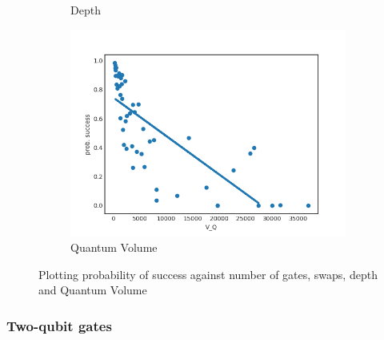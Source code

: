 \documentclass[11pt]{article}
\begin{document}
\begin{figure}[H]
\begin{subfigure}[b]{0.5\linewidth}
    \caption{Depth} 
    \label{fig:ps_d_1000} 
  \end{subfigure}%
  \begin{subfigure}[b]{0.5\linewidth}
    \centering
    \includegraphics[width=0.75\linewidth]{ps_q_1000_0_005} 
    \caption{Quantum Volume} 
    \label{fig:ps_q_1000} 
  \end{subfigure} 
  \caption{Plotting probability of success against number of gates, swaps, depth and Quantum Volume}
  \label{fig:ps_1000} 
\end{figure}

\subsubsection{Two-qubit gates}
\label{sec:orgbea4a8b}
\end{document}
